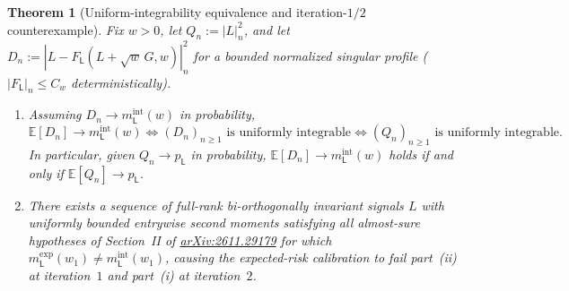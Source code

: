 \documentclass[11pt]{article}
\theoremstyle{plain}
\newtheorem{theorem}{Theorem}
\theoremstyle{definition}
\theoremstyle{remark}
\newcommand{\E}{\mathbb{E}}
\newcommand{\sL}{\mathsf{L}}
\begin{document}
\begin{theorem}[Uniform-integrability equivalence and iteration-$1/2$ counterexample]\label{thm:ui}
Fix $w > 0$, let $Q_n := |L|_n^2$, and let $D_n := |L - F_{\sL}(L + \sqrt{w}\,G, w)|_n^2$ for a bounded normalized singular profile ($|F_{\sL}|_n \le C_w$ deterministically).
\begin{enumerate}[label=\textup{(\arabic*)},leftmargin=2em,itemsep=2pt]
\item Assuming $D_n \to m_{\sL}^{\mathrm{int}}(w)$ in probability,
\[
\E[D_n] \to m_{\sL}^{\mathrm{int}}(w)
\iff (D_n)_{n\ge 1} \text{ is uniformly integrable}
\iff (Q_n)_{n\ge 1} \text{ is uniformly integrable}.
\]
In particular, given $Q_n \to p_{\sL}$ in probability, $\E[D_n] \to m_{\sL}^{\mathrm{int}}(w)$ holds if and only if $\E[Q_n] \to p_{\sL}$.
\item There exists a sequence of full-rank bi-orthogonally invariant signals $L$ with uniformly bounded entrywise second moments satisfying all almost-sure hypotheses of Section~II of \href{https://arxiv.org/abs/2611.29179}{arXiv:2611.29179} for which $m_{\sL}^{\mathrm{exp}}(w_1) \neq m_{\sL}^{\mathrm{int}}(w_1)$, causing the expected-risk calibration to fail part~\textup{(ii)} at iteration~$1$ and part~\textup{(i)} at iteration~$2$.
\end{enumerate}
\end{theorem}
\end{document}
